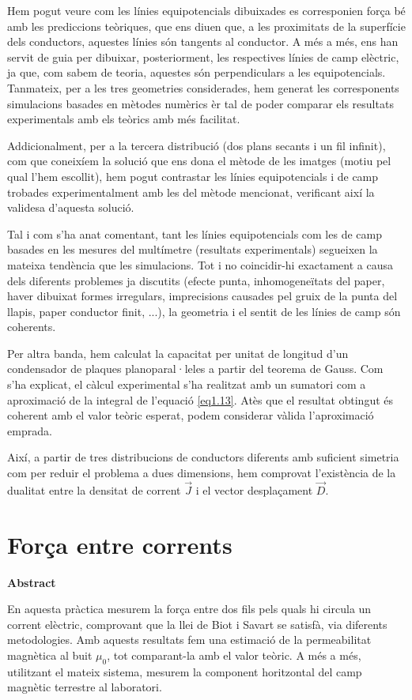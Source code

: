 \documentclass[a4paper,10.5pt]{report}
\newenvironment{chapterabstract}{
	\begin{center}
		\bfseries Abstract
	\end{center}
	\quotation
}{\endquotation}
\begin{document}
Hem pogut veure com les línies equipotencials dibuixades es corresponien força bé amb les prediccions teòriques, que ens diuen que, a les proximitats de la superfície dels conductors, aquestes línies són tangents al conductor. A més a més, ens han servit de guia per dibuixar, posteriorment, les respectives línies de camp elèctric, ja que, com sabem de teoria, aquestes són perpendiculars a les equipotencials. Tanmateix, per a les tres geometries considerades, hem generat les corresponents simulacions basades en mètodes numèrics èr tal de poder comparar els resultats experimentals amb els teòrics amb més facilitat.

Addicionalment, per a la tercera distribució (dos plans secants i un fil infinit), com que coneixíem la solució que ens dona el mètode de les imatges (motiu pel qual l'hem escollit), hem pogut contrastar les línies equipotencials i de camp trobades experimentalment amb les del mètode mencionat, verificant així la validesa d'aquesta solució.

Tal i com s'ha anat comentant, tant les línies equipotencials com les de camp basades en les mesures del multímetre (resultats experimentals) segueixen la mateixa tendència que les simulacions. Tot i no coincidir-hi exactament a causa dels diferents problemes ja discutits (efecte punta, inhomogeneïtats del paper, haver dibuixat formes irregulars, imprecisions causades pel gruix de la punta del llapis, paper conductor finit, ...), la geometria i el sentit de les línies de camp són coherents.

Per altra banda, hem calculat la capacitat per unitat de longitud d'un condensador de plaques planoparal·leles a partir del teorema de Gauss. Com s'ha explicat, el càlcul experimental s'ha realitzat amb un sumatori com a aproximació de la integral de l'equació \ref{eq1.13}. Atès que el resultat obtingut és coherent amb el valor teòric esperat, podem considerar vàlida l'aproximació emprada.

Així, a partir de tres distribucions de conductors diferents amb suficient simetria com per reduir el problema a dues dimensions, hem comprovat l'existència de la dualitat entre la densitat de corrent $\vec{J}$ i el vector desplaçament $\vec{D}$.

\chapter{Força entre corrents}
\begin{chapterabstract}
	En aquesta pràctica mesurem la força entre dos fils pels quals hi circula un corrent elèctric, comprovant que la llei de Biot i Savart se satisfà, via diferents metodologies. Amb aquests resultats fem una estimació de la permeabilitat magnètica al buit $\mu_0$, tot comparant-la amb el valor teòric. A més a més, utilitzant el mateix sistema, mesurem la component horitzontal del camp magnètic terrestre al laboratori.
\end{chapterabstract}
\end{document}
